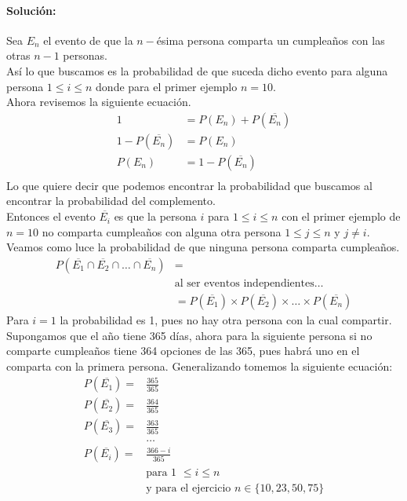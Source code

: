\documentclass[12pt]{article}
\begin{document}
\paragraph{Solución: } Sea $E_n$ el evento de que la $n-$ésima persona comparta un cumpleaños con las otras $n-1$ personas.\\
Así lo que buscamos es la probabilidad de que suceda dicho evento para alguna persona $1\leq i \leq n$ donde para el primer ejemplo $n=10$.\\
Ahora revisemos la siguiente ecuación.
\begin{equation}
\begin{split}
1 &= P(E_n) + P(\overline{E_n})\\
1 - P(\overline{E_n}) &= P(E_n)\\
P(E_n) &= 1 - P(\overline{E_n})\\
\end{split}
\end{equation}
Lo que quiere decir que podemos encontrar la probabilidad que buscamos al encontrar la probabilidad del complemento.\\
Entonces el evento $\overline{E_i}$ es que la persona $i$ para $1\leq i\leq n$ con el primer ejemplo de $n=10$ no comparta cumpleaños con alguna otra persona $1 \leq j \leq n$ y $j\neq i$.\\
Veamos como luce la probabilidad de que ninguna persona comparta cumpleaños.\\
\begin{equation}\label{ec11_1}
	\begin{split}
	P(\overline{E_1}\cap \overline{E_2} \cap \dots \cap \overline{E_n}) &=\\
	& \text{al ser eventos independientes}\dots \\
	&= P(\overline{E_1}) \times P(\overline{E_2}) \times \dots \times P(\overline{E_n})
	\end{split}
\end{equation}
Para $i=1$ la probabilidad es 1, pues no hay otra persona con la cual compartir. Supongamos que el año tiene 365 días, ahora para la siguiente persona si no comparte cumpleaños tiene 364 opciones de las 365, pues habrá uno en el comparta con la primera persona. Generalizando tomemos la siguiente ecuación:
\begin{equation}
	\begin{split}
	P(\overline{E_1})=&\frac{365}{365}\\
	P(\overline{E_2})=&\frac{364}{365}\\
	P(\overline{E_3})=&\frac{363}{365}\\
	&\dots\\
	P(\overline{E_i})=&\frac{366 - i}{365}\\
	& \text{para 1 $\leq i \leq n$}\\
	& \text{y para el ejercicio $n \in \{10,23,50,75\}$}\\
	\end{split}
\end{equation}
\end{document}

